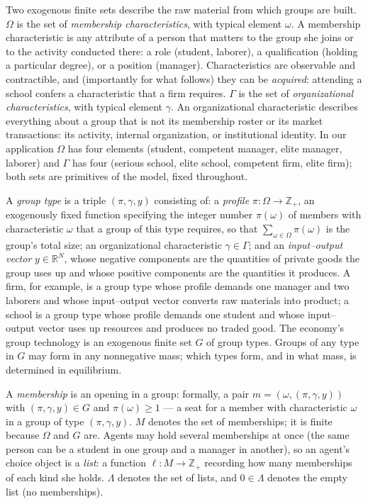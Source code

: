 \documentclass[12pt,letterpaper]{article}
\theoremstyle{definition}
\newcommand{\R}{\mathbb{R}}
\begin{document}
Two exogenous finite sets describe the raw material from which groups are built.
$\Omega$ is the set of \emph{membership characteristics}, with typical element $\omega$.
A membership characteristic is any attribute of a person that matters to the group she joins or to the activity conducted there: a role (student, laborer), a qualification (holding a particular degree), or a position (manager).
Characteristics are observable and contractible, and (importantly for what follows) they can be \emph{acquired}: attending a school confers a characteristic that a firm requires.
$\Gamma$ is the set of \emph{organizational characteristics}, with typical element $\gamma$.
An organizational characteristic describes everything about a group that is not its membership roster or its market transactions: its activity, internal organization, or institutional identity.
In our application $\Omega$ has four elements (student, competent manager, elite manager, laborer) and $\Gamma$ has four (serious school, elite school, competent firm, elite firm); both sets are primitives of the model, fixed throughout.

A \emph{group type} is a triple $(\pi,\gamma,y)$ consisting of:
a \emph{profile} $\pi:\Omega\rightarrow\mathbb{Z}_+$, an exogenously fixed function specifying the integer number $\pi(\omega)$ of members with characteristic $\omega$ that a group of this type requires, so that $\sum_{\omega\in\Omega}\pi(\omega)$ is the group's total size;
an organizational characteristic $\gamma\in\Gamma$;
and an \emph{input--output vector} $y\in\R^N$, whose negative components are the quantities of private goods the group uses up and whose positive components are the quantities it produces.
A firm, for example, is a group type whose profile demands one manager and two laborers and whose input--output vector converts raw materials into product; a school is a group type whose profile demands one student and whose input--output vector uses up resources and produces no traded good.
The economy's group technology is an exogenous finite set $G$ of group types.
Groups of any type in $G$ may form in any nonnegative mass; which types form, and in what mass, is determined in equilibrium.

A \emph{membership} is an opening in a group: formally, a pair $m=(\omega,(\pi,\gamma,y))$ with $(\pi,\gamma,y)\in G$ and $\pi(\omega)\geq 1$ --- a seat for a member with characteristic $\omega$ in a group of type $(\pi,\gamma,y)$.
$M$ denotes the set of memberships; it is finite because $\Omega$ and $G$ are.
Agents may hold several memberships at once (the same person can be a student in one group and a manager in another), so an agent's choice object is a \emph{list}: a function $\ell:M\rightarrow\mathbb{Z}_+$ recording how many memberships of each kind she holds.
$\Lambda$ denotes the set of lists, and $0\in\Lambda$ denotes the empty list (no memberships).
\end{document}
